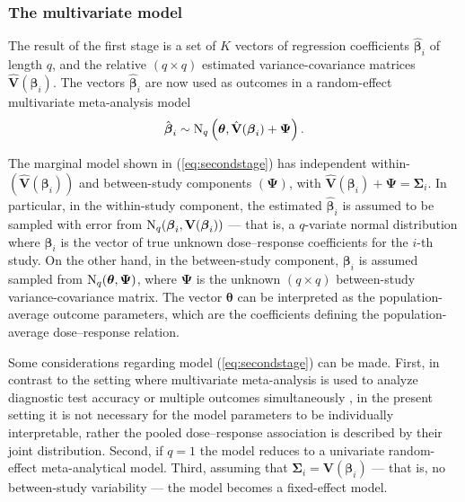 \subsubsection{The multivariate model}

The result of the first stage is a set of $K$ vectors of regression coefficients $\hat{\boldsymbol{\beta}}_i$ of length $q$, and the relative $(q \times q)$ estimated variance-covariance matrices $\hat{\mathbf{V}}(\boldsymbol{\beta}_i)$. The vectors $\hat{\boldsymbol{\beta}}_i$ are now used as outcomes in a random-effect multivariate meta-analysis model
\begin{equation}
\hat{\boldsymbol{\beta}}_i \sim \operatorname{N}_q \left(\boldsymbol{\theta}, \hat{\mathbf{V}}(\boldsymbol{\beta}_i) + \boldsymbol{\Psi} \right).
\label{eq:secondstage}
\end{equation}

The marginal model shown in (\ref{eq:secondstage}) has independent within- $(\hat{\mathbf{V}}(\boldsymbol{\beta}_i))$ and between-study components $(\boldsymbol{\Psi})$, with $\hat{\mathbf{V}}(\boldsymbol{\beta}_i) + \boldsymbol{\Psi} = \boldsymbol{\Sigma}_i$. In particular, in the within-study component, the estimated $\hat{\boldsymbol{\beta}}_i$ is assumed to be sampled with error from $\operatorname{N}_q(\boldsymbol{\beta}_i,\mathbf{V}(\boldsymbol{\beta}_i))$ --- that is, a $q$-variate normal distribution where $\boldsymbol{\beta}_i$  is the vector of true unknown dose--response  coefficients for the $i$-th study. On the other hand, in the between-study component, $\boldsymbol{\beta}_i$ is assumed sampled from $\operatorname{N}_q(\boldsymbol{\theta},\boldsymbol{\Psi})$, where $\boldsymbol{\Psi}$ is the unknown $(q\times q)$ between-study variance-covariance matrix. The vector $\boldsymbol{\theta}$ can be interpreted as the population-average outcome parameters, which are the coefficients defining the population-average dose--response relation.

Some considerations regarding model (\ref{eq:secondstage}) can be made. First, in contrast to the setting where multivariate meta-analysis is used to analyze diagnostic test accuracy or multiple outcomes simultaneously \citep{arends_combining_2003}, in the present setting it is not necessary for the model parameters to be individually interpretable, rather the pooled dose--response association is described by their joint distribution. Second, if $q=1$ the model reduces to a univariate random-effect meta-analytical model. Third, assuming that $\boldsymbol{\Sigma}_i = \mathbf{V}(\boldsymbol{\beta}_i)$  --- that is, no between-study variability --- the model becomes a fixed-effect model.  

